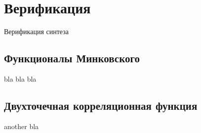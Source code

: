 \clearpage
\section{Верификация}

	Верификация синтеза
	
	\subsection{Функционалы Минковского}
		bla bla bla
	
	\subsection{Двухточечная корреляционная функция}
		another bla